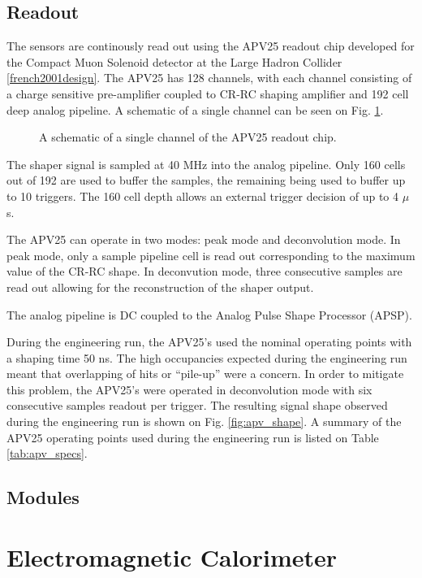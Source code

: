 \subsection*{Readout}

The sensors are continously read out using the APV25 readout chip developed for
the Compact Muon Solenoid detector at the Large Hadron Collider 
\ref{french2001design}. The APV25 has 128 channels, with each channel consisting
of a charge sensitive pre-amplifier coupled to CR-RC shaping amplifier and 192
cell deep analog pipeline.  A schematic of a single channel can be seen on 
Fig. \ref{fig:apv25_schem}.
\begin{figure}
    \centering
    \caption{A schematic of a single channel of the APV25 readout chip.}
    \label{fig:apv25_schem}
\end{figure}

The shaper signal is sampled at 40 MHz into the analog pipeline.  Only 160 cells
out of 192 are used to buffer the samples, the remaining being used to buffer
up to 10 triggers.  The 160 cell depth allows an external trigger decision of 
up to 4 $\mu$s.    

The APV25 can operate in two modes: peak mode and deconvolution mode.  In peak
mode, only a sample pipeline cell is read out corresponding to the maximum 
value of the CR-RC shape.  In deconvution mode, three consecutive samples are
read out allowing for the reconstruction of the shaper output.

The analog pipeline is DC coupled to the Analog Pulse Shape Processor (APSP).

During the engineering run, the APV25's used the nominal  operating points with
a shaping time 50 ns.  The high occupancies expected during the engineering run
meant that overlapping of hits or ``pile-up'' were a concern.  In order to 
mitigate this problem, the APV25's were operated in deconvolution mode with
six consecutive samples readout per trigger.  The resulting signal shape 
observed during the engineering run is shown on Fig. \ref{fig:apv_shape}.  A 
summary of the APV25 operating points used during the engineering run is listed
on Table \ref{tab:apv_specs}.

\subsection*{Modules}

\section{Electromagnetic Calorimeter}

